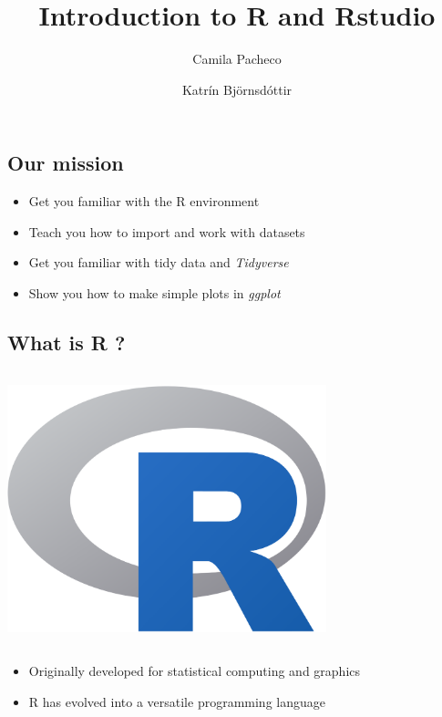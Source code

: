 \documentclass[
  letterpaper,
  DIV=11,
  numbers=noendperiod,
  oneside]{scrartcl}
\title{Introduction to R and Rstudio}
\author{Camila Pacheco \and Katrín Björnsdóttir}
\date{}
\providecommand{\tightlist}{%
  \setlength{\itemsep}{0pt}\setlength{\parskip}{0pt}}\usepackage{longtable,booktabs,array}
\renewcommand*\contentsname{Table of contents}
\newcommand\contentsname{Table of contents}
\begin{document}
\maketitle

\renewcommand*\contentsname{Table of contents}
{
\hypersetup{linkcolor=}
\setcounter{tocdepth}{3}
\tableofcontents
}
\subsection{Our mission}\label{our-mission}

\begin{itemize}
\item
  Get you familiar with the R environment
\item
  Teach you how to import and work with datasets
\item
  Get you familiar with tidy data and \emph{Tidyverse}
\item
  Show you how to make simple plots in \emph{ggplot}
\end{itemize}

\subsection{What is R ?}\label{what-is-r}

\includegraphics[width=3.64583in,height=3.125in]{Intro_R_files/mediabag/1086px-R_logo.svg.png}

\begin{itemize}
\tightlist
\item
  Originally developed for statistical computing and graphics
\item
  R has evolved into a versatile programming language
\end{itemize}
\end{document}
